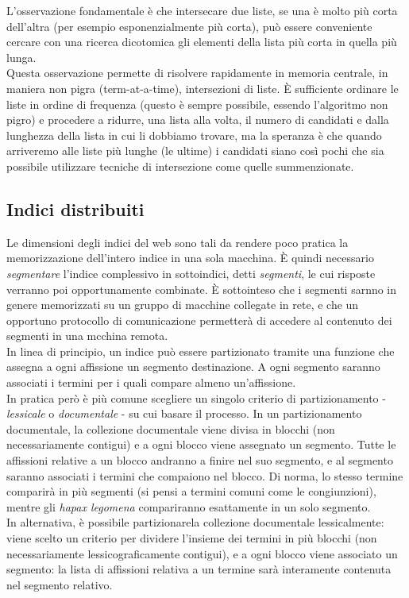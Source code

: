 L'osservazione fondamentale è che intersecare due liste, se una è molto più corta dell'altra (per esempio esponenzialmente più corta), può essere conveniente cercare con una ricerca dicotomica gli elementi della lista più corta in quella più lunga.\\
Questa osservazione permette di risolvere rapidamente in memoria centrale, in maniera non pigra (term-at-a-time), intersezioni di liste. È sufficiente ordinare le liste in ordine di frequenza (questo è sempre possibile, essendo l'algoritmo non pigro) e procedere a ridurre, una lista alla volta, il numero di candidati e dalla lunghezza della lista in cui li dobbiamo trovare, ma la speranza è che quando arriveremo alle liste più lunghe (le ultime) i candidati siano così pochi che sia possibile utilizzare tecniche di intersezione come quelle summenzionate.
\subsection{Indici distribuiti}
Le dimensioni degli indici del web sono tali da rendere poco pratica la memorizzazione dell'intero indice in una sola macchina. È quindi necessario \textit{segmentare} l'indice complessivo in sottoindici, detti \textit{segmenti}, le cui risposte verranno poi opportunamente combinate. È sottointeso che i segmenti sarnno in genere memorizzati su un gruppo di macchine collegate in rete, e che un opportuno protocollo di comunicazione permetterà di accedere al contenuto dei segmenti in una mcchina remota.\\
In linea di principio, un indice può essere partizionato tramite una funzione che assegna a ogni affissione un segmento destinazione. A ogni segmento saranno associati i termini per i quali compare almeno un'affissione.\\
In pratica però è più comune scegliere un singolo criterio di partizionamento - \textit{lessicale} o \textit{documentale} - su cui basare il processo. In un partizionamento documentale, la collezione documentale viene divisa in blocchi (non necessariamente contigui) e a ogni blocco viene assegnato un segmento. Tutte le affissioni relative a un blocco andranno a finire nel suo segmento, e al segmento saranno associati i termini che compaiono nel blocco. Di norma, lo stesso termine comparirà in più segmenti (si pensi a termini comuni come le congiunzioni), mentre gli \textit{hapax legomena} compariranno esattamente in un solo segmento.\\
In alternativa, è possibile partizionarela collezione documentale lessicalmente: viene scelto un criterio per dividere l'insieme dei termini in più blocchi (non necessariamente lessicograficamente contigui), e a ogni blocco viene associato un segmento: la lista di affissioni relativa a un termine sarà interamente contenuta nel segmento relativo.\\
